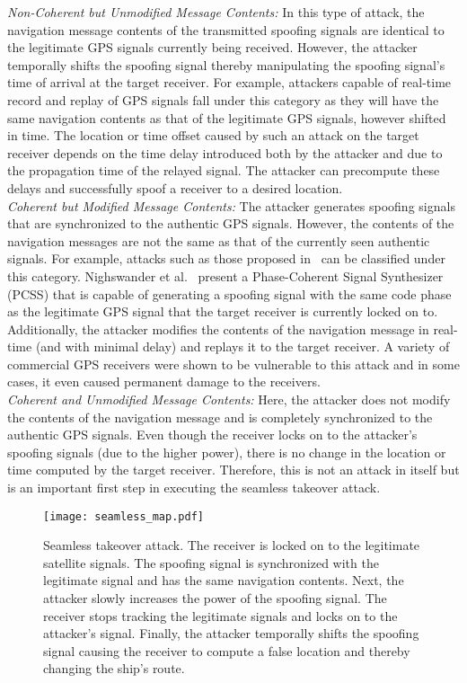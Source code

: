 \documentclass[letterpaper,twocolumn,10pt]{article}
\begin{document}
\noindent\textit{Non-Coherent but Unmodified Message Contents:} In this type of attack, the navigation message contents of the transmitted spoofing signals are identical to the legitimate GPS signals currently being received. However, the attacker temporally shifts the spoofing signal thereby manipulating the spoofing signal's time of arrival at the target receiver. For example, attackers capable of real-time record and replay of GPS signals fall under this category as they will have the same navigation contents as that of the legitimate GPS signals, however shifted in time. The location or time offset caused by such an attack on the target receiver depends on the time delay introduced both by the attacker and due to the propagation time of the relayed signal. The attacker can precompute these delays and successfully spoof a receiver to a desired location.\\

\noindent\textit{Coherent but Modified Message Contents:} The attacker generates spoofing signals that are synchronized to the authentic GPS signals. However, the contents of the navigation messages are not the same as that of the currently seen authentic signals. For example, attacks such as those proposed in~\cite{NighswanderCCS2012} can be classified under this category. Nighswander et al.~\cite{NighswanderCCS2012} present a Phase-Coherent Signal Synthesizer (PCSS) that is capable of generating a spoofing signal with the same code phase as the legitimate GPS signal that the target receiver is currently locked on to. Additionally, the attacker modifies the contents of the navigation message in real-time (and with minimal delay) and replays it to the target receiver. A variety of commercial GPS receivers were shown to be vulnerable to this attack and in some cases, it even caused permanent damage to the receivers.\\



\noindent\textit{Coherent and Unmodified Message Contents:} Here, the attacker does not modify the contents of the navigation message and is completely synchronized to the authentic GPS signals. Even though the receiver locks on to the attacker's spoofing signals (due to the higher power), there is no change in the location or time computed by the target receiver. Therefore, this is not an attack in itself but is an important first step in executing the seamless takeover attack. \\
\begin{figure*}[t]
  \centering
  \texttt{[image: seamless\_map.pdf]}
  \caption{Seamless takeover attack. The receiver is locked on to the legitimate satellite signals. The spoofing signal is synchronized with the legitimate signal and has the same navigation contents. Next, the attacker slowly increases the power of the spoofing signal. The receiver stops tracking the legitimate signals and locks on to the attacker's signal. Finally, the attacker temporally shifts the spoofing signal causing the receiver to compute a false location and thereby changing the ship's route.}
  \label{fig:seamless-takeover}
\end{figure*}
\end{document}
